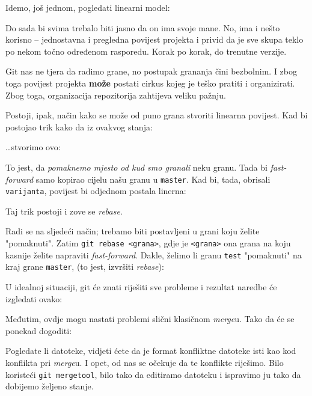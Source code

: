 Idemo, još jednom, pogledati linearni model:



Do sada bi svima trebalo biti jasno da on ima svoje mane.
No, ima i nešto korisno -- jednostavna i pregledna povijest projekta i privid da je sve skupa teklo po nekom točno određenom rasporedu.
Korak po korak, do trenutne verzije.

Git nas ne tjera da radimo grane, no postupak grananja čini bezbolnim. 
I zbog toga povijest projekta \textbf{može} postati cirkus kojeg je teško pratiti i organizirati.
Zbog toga, organizacija repozitorija zahtijeva veliku pažnju.

Postoji, ipak, način kako se može od puno grana stvoriti linearna povijest.
Kad bi postojao trik kako da iz ovakvog stanja:



\dots{}stvorimo ovo:



To jest, da \emph{pomaknemo mjesto od kud smo granali} neku granu. 
Tada bi \emph{fast-forward} samo kopirao cijelu našu granu u \verb+master+.
Kad bi, tada, obrisali \verb+varijanta+, povijest bi odjednom postala linerna:



Taj trik postoji i zove se \emph{rebase}.

Radi se na sljedeći način; trebamo biti postavljeni u grani koju želite "pomaknuti". Zatim \verb+git rebase <grana>+, gdje je \verb+<grana>+ ona grana na koju kasnije želite napraviti \emph{fast-forward}. 
Dakle, želimo li granu \verb+test+ "pomaknuti" na kraj grane \verb+master+, (to jest, izvršiti \emph{rebase}):


U idealnoj situaciji, git će znati riješiti sve probleme i rezultat naredbe će izgledati ovako:



Međutim, ovdje mogu nastati problemi slični klasičnom \emph{merge}u.
Tako da će se ponekad dogoditi:



Pogledate li datoteke, vidjeti ćete da je format konfliktne datoteke isti kao kod konflikta pri \emph{merge}u.
I opet, od nas se očekuje da te konflikte riješimo.
Bilo koristeći \verb+git mergetool+, bilo tako da editiramo datoteku i ispravimo ju tako da dobijemo željeno stanje.

